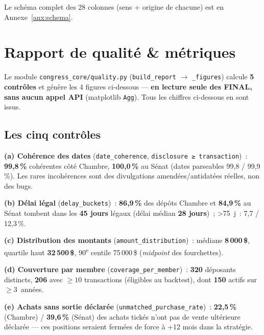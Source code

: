 \documentclass[11pt,a4paper]{article}
\newcommand{\co}[1]{\texttt{\small #1}}
\begin{document}
Le schéma complet des 28 colonnes (sens + origine de chacune) est en Annexe~\ref{anx:schema}.

\section{Rapport de qualité \& métriques}
\label{sec:qualite}

Le module \co{congress_core/quality.py} (\co{build_report} $\rightarrow$ \co{_figures}) calcule
\textbf{5 contrôles} et génère les 4 figures ci-dessous — \textbf{en lecture seule des FINAL, sans
aucun appel API} (matplotlib \co{Agg}). Tous les chiffres ci-dessous en sont issus.

\subsection{Les cinq contrôles}
\textbf{(a) Cohérence des dates} (\co{date_coherence}, \co{disclosure ≥ transaction})~:
\textbf{99,8\,\%} cohérentes côté Chambre, \textbf{100,0\,\%} au Sénat (dates parseables 99,8 / 99,9\,\%).
Les rares incohérences sont des divulgations amendées/antidatées réelles, non des bugs.

\textbf{(b) Délai légal} (\co{delay_buckets})~: \textbf{86,9\,\%} des dépôts Chambre et \textbf{84,9\,\%}
au Sénat tombent dans les \textbf{45 jours} légaux (délai médian \textbf{28 jours})~; >75~j~: 7,7 / 12,3\,\%.

\textbf{(c) Distribution des montants} (\co{amount_distribution})~: médiane \textbf{8\,000\,\$},
quartile haut \textbf{32\,500\,\$}, 90\textsuperscript{e} centile 75\,000\,\$ (\emph{midpoint} des
fourchettes).

\textbf{(d) Couverture par membre} (\co{coverage_per_member})~: \textbf{320} déposants distincts,
\textbf{206} avec $\geq 10$ transactions (éligibles au backtest), dont \textbf{150} actifs sur
$\geq 3$~années.

\textbf{(e) Achats sans sortie déclarée} (\co{unmatched_purchase_rate})~: \textbf{22,5\,\%} (Chambre) /
\textbf{39,6\,\%} (Sénat) des achats tickés n'ont pas de vente ultérieure déclarée — ces positions
seraient fermées de force à +12 mois dans la stratégie.
\end{document}
